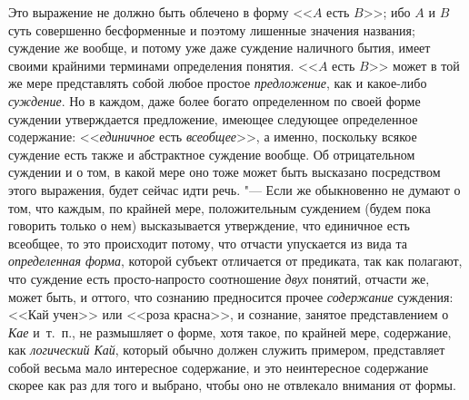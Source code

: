 {Это выражение не должно быть облечено в форму
<<$A$ есть $B$>>; ибо $A$ и $B$ суть совершенно
бесформенные и поэтому лишенные значения названия; суждение
же вообще, и потому уже даже суждение наличного бытия, имеет своими
крайними терминами определения понятия.
<<$A$ есть $B$>> может в той же
мере представлять собой любое простое
{\em предложение}, как и какое-либо {\em суждение}.
Но в каждом, даже более богато определенном по своей форме
суждении утверждается предложение, имеющее следующее определенное
содержание: <<{\em единичное} есть {\em всеобщее}>>,
а именно, поскольку всякое суждение есть также и абстрактное
суждение вообще. Об отрицательном суждении и о том, в какой мере оно тоже
может быть высказано посредством этого выражения, будет сейчас идти речь.
"--- Если же обыкновенно не думают о том, что каждым, по крайней
мере, положительным суждением (будем пока говорить только о нем)
высказывается утверждение, что единичное есть всеобщее, то это происходит
потому, что отчасти упускается из вида та
{\em определенная форма},
которой субъект отличается от предиката, так как полагают,
что суждение есть просто-напросто соотношение
{\em двух} понятий,
отчасти же, может быть, и оттого, что сознанию предносится прочее
{\em содержание}
суждения: <<Кай учен>> или <<роза красна>>, и сознание, занятое
представлением о {\em Кае}
и~т.~п., не размышляет о форме, хотя такое, по крайней мере,
содержание, как {\em логический Кай},
который обычно должен служить примером, представляет собой
весьма мало интересное содержание, и это неинтересное содержание скорее как
раз для того и выбрано, чтобы оно не отвлекало внимания от
формы.

}
